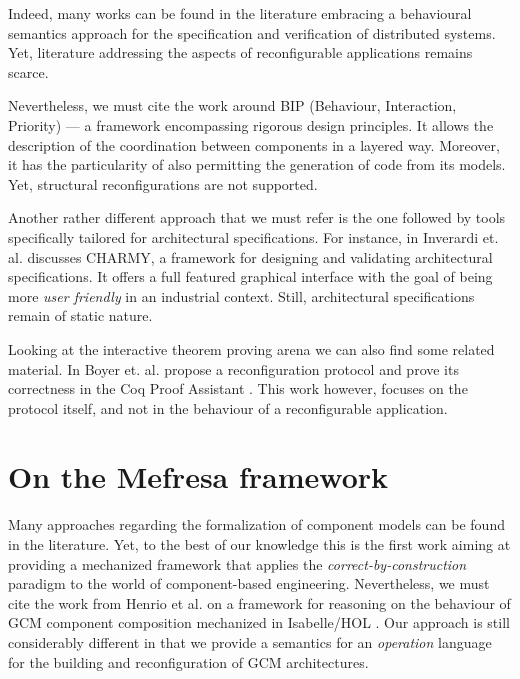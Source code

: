 		  	
		Indeed, many works can be found in the literature embracing a behavioural semantics
		approach for the specification and verification of distributed systems. Yet, 
		literature addressing the aspects of reconfigurable applications remains 
		scarce. 

		
 Nevertheless, we must cite the work around
	    BIP (Behaviour, Interaction, Priority) \cite{BBB+11a} --- a framework 
	 encompassing rigorous design principles. It allows the description of the 
	 coordination between components
	 in a layered way. Moreover, it has the particularity of also permitting the 
	 generation of code from its models. Yet, structural reconfigurations are not supported. 
	 	
	Another rather different approach that we must refer is the one followed by tools 
	specifically tailored for architectural specifications. For instance, in \cite{p.2005-1} Inverardi et. al. 
	discusses \textsf{CHARMY}, a framework for designing and validating architectural 
	specifications. It offers a full featured graphical interface with the goal of being more 
	\textit{user friendly} in an industrial context. Still,
	architectural specifications remain of static nature. 
	
	
	
		Looking at the interactive theorem proving arena we can also find some
	related material. In %
	\cite{Boyer:2013:RRC:2486788.2486791} Boyer et. al. propose a reconfiguration protocol
	and prove its correctness in the Coq Proof Assistant \cite{09thecoq}. This work however, focuses on the protocol itself, 
	and not in the behaviour of a reconfigurable application. 
   





\section{On the Mefresa framework}
\label{sec:relmefresa}



 
 Many approaches regarding the formalization of component models can be found in the literature. Yet,
	to the best of our knowledge this is the first work aiming at providing a mechanized framework
    that applies the \textit{correct-by-construction} paradigm to the world of component-based engineering.
	Nevertheless, we must cite the work from Henrio et al. \cite{HKK:FMCO09} on a framework for reasoning 
	on the behaviour of GCM component composition mechanized in Isabelle/HOL \cite{Nipkow-Paulson-Wenzel:2002}. 
	Our approach is still considerably different
	in that we provide a semantics for an \textit{operation} language for the building 
	and reconfiguration of GCM architectures.
	
